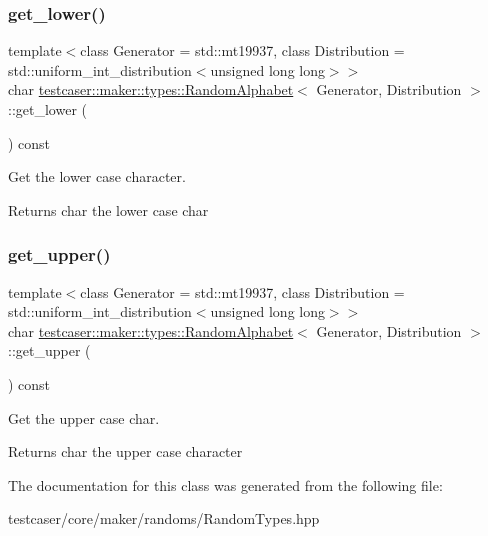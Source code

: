 \subsubsection{\texorpdfstring{get\_lower()}{get\_lower()}}
{\footnotesize\ttfamily template$<$class Generator = std\+::mt19937, class Distribution = std\+::uniform\+\_\+int\+\_\+distribution$<$unsigned long long$>$$>$ \\
char \mbox{\hyperlink{classtestcaser_1_1maker_1_1types_1_1RandomAlphabet}{testcaser\+::maker\+::types\+::\+Random\+Alphabet}}$<$ Generator, Distribution $>$\+::get\+\_\+lower (\begin{DoxyParamCaption}{ }\end{DoxyParamCaption}) const\hspace{0.3cm}{\ttfamily [inline]}}



Get the lower case character. 

\begin{DoxyReturn}{Returns}
char the lower case char 
\end{DoxyReturn}
\mbox{\label{classtestcaser_1_1maker_1_1types_1_1RandomAlphabet_a398a597e207dea4a284537feb8fc6086}} 
\subsubsection{\texorpdfstring{get\_upper()}{get\_upper()}}
{\footnotesize\ttfamily template$<$class Generator = std\+::mt19937, class Distribution = std\+::uniform\+\_\+int\+\_\+distribution$<$unsigned long long$>$$>$ \\
char \mbox{\hyperlink{classtestcaser_1_1maker_1_1types_1_1RandomAlphabet}{testcaser\+::maker\+::types\+::\+Random\+Alphabet}}$<$ Generator, Distribution $>$\+::get\+\_\+upper (\begin{DoxyParamCaption}{ }\end{DoxyParamCaption}) const\hspace{0.3cm}{\ttfamily [inline]}}



Get the upper case char. 

\begin{DoxyReturn}{Returns}
char the upper case character 
\end{DoxyReturn}


The documentation for this class was generated from the following file\+:\begin{DoxyCompactItemize}
\item 
testcaser/core/maker/randoms/Random\+Types.\+hpp\end{DoxyCompactItemize}
